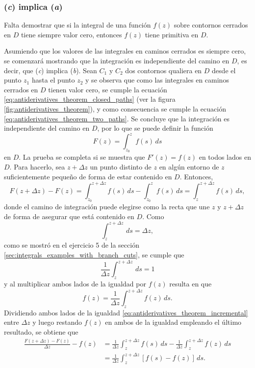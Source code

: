 \documentclass[a4paper]{report}
\begin{document}
\subsubsection*{(\textit{c}) implica (\textit{a})}

Falta demostrar que si la integral de una función \(f(z)\) sobre contornos cerrados en \(D\) tiene siempre valor cero, entonces \(f(z)\) tiene primitiva en \(D\).

Asumiendo que los valores de las integrales en caminos cerrados es siempre cero, se comenzará mostrando que la integración es independiente del camino en \(D\), es decir, que (\textit{c}) implica (\textit{b}). Sean \(C_1\) y \(C_2\) dos contornos qualiera en \(D\) desde el punto \(z_1\) hasta el punto \(z_2\) y se observa que como las integrales en caminos cerrados en \(D\) tienen valor cero, se cumple la ecuación \ref{eq:antiderivatives_theorem_closed_paths} (ver la figura \ref{fig:antiderivatives_theorem}), y como consecuencia se cumple la ecuación \ref{eq:antiderivatives_theorem_two_paths}. Se concluye que la integración es independiente del camino en \(D\), por lo que se puede definir la función
\[
 F(z)=\int_{z_0}^zf(s)\,ds
\]
en \(D\). La prueba se completa si se muestra que \(F'(z)=f(z)\) en todos lados en \(D\). Para hacerlo, sea \(z+\Delta z\) un punto distinto de \(z\) en algún entorno de \(z\) suficientemente pequeño de forma de estar contenido en \(D\). Entonces,
\begin{equation}\label{eq:antiderivatives_theorem_incremental}
  F(z+\Delta z)-F(z)=\int_{z_0}^{z+\Delta z}f(s)\,ds-\int_{z_0}^zf(s)\,ds=\int_{z}^{z+\Delta z}f(s)\,ds,
\end{equation}
donde el camino de integración puede elegirse como la recta que une \(z\) y \(z+\Delta z\) de forma de asegurar que está contenido en \(D\). Como
\[
 \int_{z}^{z+\Delta z}\,ds=\Delta z,
\]
como se mostró en el ejercicio 5 de la sección \ref{sec:integrals_examples_with_branch_cuts}, se cumple que 
\[
 \frac{1}{\Delta z}\int_{z}^{z+\Delta z}\,ds=1
\]
y al multiplicar ambos lados de la igualdad por \(f(z)\) resulta en que 
\[
 f(z)=\frac{1}{\Delta z}\int_{z}^{z+\Delta z}f(z)\,ds.
\]
Dividiendo ambos lados de la igualdad \ref{eq:antiderivatives_theorem_incremental} entre \(\Delta z\) y luego restando \(f(z)\) en ambos de la igualdad empleando el último resultado, se obtiene que 
\begin{align*}
 \frac{F(z+\Delta z)-F(z)}{\Delta z}-f(z)&=\frac{1}{\Delta z}\int_{z}^{z+\Delta z}f(s)\,ds-\frac{1}{\Delta z}\int_{z}^{z+\Delta z}f(z)\,ds\\
 &=\frac{1}{\Delta z}\int_{z}^{z+\Delta z}[f(s)-f(z)]\,ds. 
\end{align*}
\end{document}
